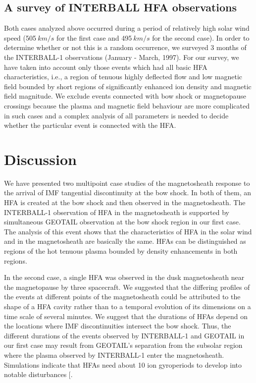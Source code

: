 \begin{article}
\subsection{A survey of INTERBALL HFA observations}
Both cases analyzed above occurred during a period of relatively
high solar wind speed (505$\>km/s$ for the first case and
495$\>km/s$ for the
second case). In order to determine whether or not this is a random
occurrence, we surveyed  3 months of the INTERBALL-1
observations (January - March, 1997).
For our survey, we have taken into account only those events
which had all basic HFA characteristics, i.e., a region of tenuous
highly deflected flow and low magnetic field bounded by short
regions of significantly enhanced ion density and magnetic field
magnitude. We exclude events connected with bow shock or
magnetopause crossings because the plasma and magnetic field
behaviour are more complicated in such cases and a complex
analysis of all parameters is needed to decide whether the particular
event is connected with the HFA.

\section{Discussion}
We have presented two multipoint case studies of the
magnetosheath response to the arrival of  IMF tangential
discontinuity at the bow shock.
In both of them, an HFA is created at the bow shock and then
observed in the magnetosheath. The INTERBALL-1 observation of HFA
in the magnetosheath is supported by simultaneous GEOTAIL
observation at the bow shock region in our first case. The analysis
of this event shows that the characteristics of HFA in the
solar wind and in the magnetosheath are basically the same. HFAs
can be distinguished as regions of the hot tenuous plasma bounded
by density enhancements in both regions.

In the second case, a single HFA was observed in the dusk magnetosheath
near the magnetopause by three spacecraft.
We suggested that the differing profiles of the
events at different points of the magnetosheath could be attributed
to the shape of a HFA cavity rather than to a temporal evolution of
its dimensions on a time scale of several minutes.
We suggest that the durations of HFAs depend on the locations
where IMF discontinuities intersect the bow shock.
Thus, the different durations of the events observed by
INTERBALL-1 and GEOTAIL  in our first case  may result from
GEOTAIL's separation from the subsolar region where the plasma
observed by INTERBALL-1 enter the magnetosheath.
Simulations indicate that HFAs need about 10
ion gyroperiods to develop into notable disturbances [\markcite{{\it
Thomas et al.}, 1991]}.


\end{article}

